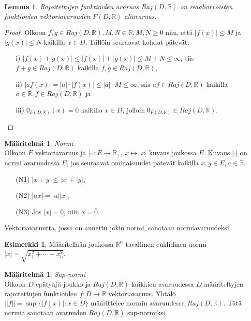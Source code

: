 \documentclass[12pt,a4paper,leqno]{report}
\newcommand{\R}{\mathbb{R}}
\theoremstyle{plain}
\newtheorem{lem}[equation]{Lemma}
\theoremstyle{definition}
\newtheorem{maar}[equation]{Määritelmä}
\newtheorem{esim}[equation]{Esimerkki}
\theoremstyle{remark}
\begin{document}
\begin{lem}
Rajoitettujen funktioiden avaruus $Raj(D,\R )$ on reaaliarvoisten funktioiden vektoriavaruuden $F(D,\R)$ aliavaruus.
\end{lem}
\begin{proof}
 Olkoon $f,g\in Raj(D,\R),M,N\in\R, M,N\geq 0$ niin, että $|f(x)|\leq M$ ja $|g(x)|\leq N$ kaikilla $x\in D$. Tällöin seuraavat kohdat pätevät: 
\begin{itemize}
\item[i)\phantom{iiv}] $|f(x)+g(x)|\leq|f(x)|+|g(x)|\leq M+N\leq\infty$, siis $f+g\in Raj(D,\R)$ kaikilla $f,g\in Raj(D,\R),$
\item[ii)\phantom{iv}] $|af(x)|= |a|\cdot|f(x)|\leq |a|\cdot M\leq\infty$, siis $af\in Raj(D,\R)$ kaikilla $a\in\R, f\in Raj(D,\R)$ ja
\item[iii)\phantom{v}] $0_{F(D,\R)}(x)=0$ kaikilla $x\in D$, jolloin $0_{F(D,\R)} \in Raj(D,\R )$.
\end{itemize}
\end{proof}

\begin{maar} \emph{Normi}\\
Olkoon $E$ vektoriavaruus ja $|\cdot|\colon E\rightarrow \R_+$, $x\mapsto|x|$ kuvaus joukossa $E$. %
Kuvaus $|\cdot|$ on normi avaruudessa $E$, jos seuraavat ominaisuudet pätevät kaikilla $ x,y\in E, a\in\R$.
\begin{itemize}
\item[(N1)]$|x+y|\leq |x|+|y|$,
\item[(N2)]$|ax|=|a||x|$,
\item[(N3)]Jos $|x|=0$, niin $x=\bar{0}$.
\end{itemize} 
Vektoriavaruutta, jossa on annettu jokin normi, sanotaan normiavaruudeksi.

\end{maar} 

\begin{esim}
Määritellään joukossa $\R ^n$ tavallinen euklidinen normi $|x| = \sqrt{x^{2}_{1} + \cdots +x^{2}_{n}}$.

\end{esim}

\begin{maar}\label{sup-normi} \emph{Sup-normi}\\
Olkoon $D$ epätyhjä joukko ja $Raj(D,\R )$ kaikkien avaruudessa $D$ määriteltyjen rajoitettujen funktioiden $f\colon D\rightarrow \R$ vektoriavaruus. Yhtälö $||f||=\sup\{|f(x)|\colon x\in D\}$ määrittelee normin avaruudessa $Raj(D,\R )$. %
Tätä normia sanotaan avaruuden $Raj(D,\R )$ sup-normiksi.

\end{maar} 
\end{document}

